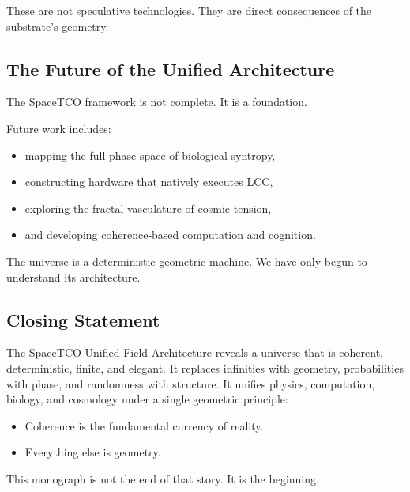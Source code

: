 \documentclass[reprint,amsmath,amssymb,aps,prl,floatfix]{revtex4-2}
\begin{document}
\medskip

These are not speculative technologies.  
They are direct consequences of the substrate’s geometry.

\subsection{The Future of the Unified Architecture}

The SpaceTCO framework is not complete.  
It is a foundation.
\medskip

Future work includes:
\begin{itemize}
\item mapping the full phase‑space of biological syntropy,  
\item constructing hardware that natively executes LCC,  
\item exploring the fractal vasculature of cosmic tension,  
\item and developing coherence‑based computation and cognition.
\end{itemize}
\medskip

The universe is a deterministic geometric machine.  
We have only begun to understand its architecture.

\subsection{Closing Statement}

The SpaceTCO Unified Field Architecture reveals a universe that is coherent, deterministic, finite, and elegant. It replaces infinities with geometry, probabilities with phase, and randomness with structure. It unifies physics, computation, biology, and cosmology under a single geometric principle:
\begin{itemize}
\item Coherence is the fundamental currency of reality.  
\item Everything else is geometry.
\end{itemize}
\medskip

This monograph is not the end of that story.  
It is the beginning.
\end{document}
